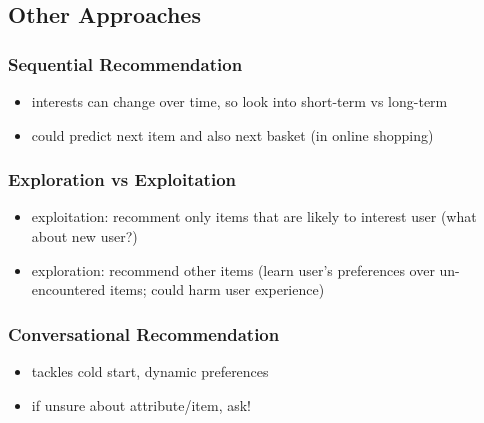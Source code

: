 \subsection{Other Approaches}
\subsubsection{Sequential Recommendation}
\begin{itemize}
    \item interests can change over time, so look into short-term vs long-term
    \item could predict next item and also next basket (in online shopping)
\end{itemize}
\subsubsection{Exploration vs Exploitation}
\begin{itemize}
    \item exploitation: recomment only items that are likely to interest user (what about new user?)
    \item exploration: recommend other items (learn user's preferences over un-encountered items; could harm user experience)
\end{itemize}
\subsubsection{Conversational Recommendation}
\begin{itemize}
    \item tackles cold start, dynamic preferences
    \item if unsure about attribute/item, ask!
\end{itemize}
